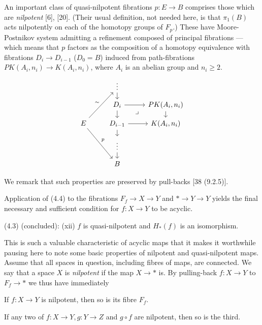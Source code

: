 An important class of quasi-nilpotent fibrations $p \colon   E \longrightarrow B$ comprises those which are {\em nilpotent} [6], [20]. (Their usual definition, not needed here, is that $\pi_1(B)$ acts nilpotently on each of the homotopy groups of $F_p$.) These have Moore-Postnikov system admitting a refinement composed of principal fibrations --- which means that $p$ factors as the composition of a homotopy equivalence with fibrations $D_i\longrightarrow D_{i-1}$ ($D_0 = B$) induced from path-fibrations $PK(A_i, n_i)\longrightarrow K(A_i,n_i)$, where $A_i$ is an abelian group and $n_i \geqslant 2$.
\[\begin{tikzcd}[row sep=small]
    & \vdots \arrow{d} &\\
    &  D_i \arrow{d} \arrow{r} \arrow[dr, phantom, "\lrcorner"]& PK(A_i,n_i) \arrow{d}\\
E\arrow{ruu}{\sim} \arrow{rdd}{p}   &  D_{i-1}  \arrow{d} \arrow{r}   & K(A_i,n_i) \\
    & \vdots \arrow{d} &\\
    & B &
\end{tikzcd}\]

We remark that such properties are preserved by pull-backs [38 (9.2.5)].

Application of (4.4) to the fibrations $F_f\longrightarrow X \longrightarrow Y$ and $* \longrightarrow Y \longrightarrow Y$ yields the final necessary and sufficient condition for $f\colon   X\longrightarrow Y$ to be acyclic.

(4.3) (concluded): (xii) $f$ is quasi-nilpotent and $H_*(f)$ is an isomorphism.

This is such a valuable characteristic of acyclic maps that it makes it worthwhile pausing here to note some basic properties of nilpotent and quasi-nilpotent maps. Assume that all spaces in question, including fibres of maps, are connected. We say that a space $X$ is {\em nilpotent} if the map $X \longrightarrow  *$ is. By pulling-back $f\colon   X \longrightarrow Y$ to $F_f \longrightarrow *$ we thus have immediately
\begin{prop}
  If $f\colon  X\longrightarrow Y$ is nilpotent, then so is its fibre $F_f$.
\end{prop}

\begin{prop}
[6 II 4.4] If any two of $f\colon  X\longrightarrow Y,g\colon   Y\longrightarrow Z$ and $g\circ f$ are nilpotent, then so is the third.
 \end{prop}   

